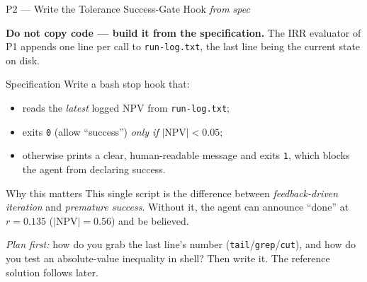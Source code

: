 \documentclass[9pt,t]{beamer}
\begin{document}
\begin{frame}{P2 --- Write the Tolerance Success-Gate Hook \emph{from spec}}

\textbf{Do not copy code --- build it from the specification.} The IRR evaluator
of P1 appends one line per call to \texttt{run-log.txt}, the last line being the
current state on disk.

\medskip
\begin{block}{Specification}
Write a bash stop hook that:
\begin{itemize}
  \item reads the \emph{latest} logged NPV from \texttt{run-log.txt};
  \item exits \texttt{0} (allow ``success'') \emph{only if} $|\mathrm{NPV}|<0.05$;
  \item otherwise prints a clear, human-readable message and exits \texttt{1},
        which \alert{blocks} the agent from declaring success.
\end{itemize}
\end{block}

\medskip
\begin{alertblock}{Why this matters}
This single script is the difference between \emph{feedback-driven iteration} and
\emph{premature success}. Without it, the agent can announce ``done'' at
$r=0.135$ ($|\mathrm{NPV}|=0.56$) and be believed.
\end{alertblock}

\medskip
\footnotesize \emph{Plan first:} how do you grab the last line's number
(\texttt{tail}/\texttt{grep}/\texttt{cut}), and how do you test an absolute-value
inequality in shell? Then write it. The reference solution follows later.
\end{frame}
\end{document}
